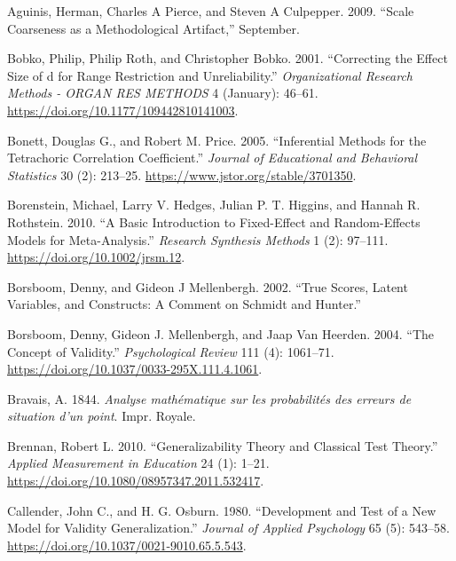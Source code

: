 \documentclass[
  letterpaper,
  DIV=11,
  numbers=noendperiod]{scrreprt}
\newlength{\cslhangindent}
\newlength{\cslentryspacingunit} %
\newenvironment{CSLReferences}[2] %
 {%
  \setlength{\parindent}{0pt}
  \ifodd #1
  \let\oldpar\par
  \def\par{\hangindent=\cslhangindent\oldpar}
  \fi
  \setlength{\parskip}{#2\cslentryspacingunit}
 }%
 {}
\begin{document}
\hypertarget{refs}{}
\begin{CSLReferences}{1}{0}
\leavevmode{}%
Aguinis, Herman, Charles A Pierce, and Steven A Culpepper. 2009.
{``Scale Coarseness as a Methodological Artifact,''} September.

\leavevmode{}%
Bobko, Philip, Philip Roth, and Christopher Bobko. 2001. {``Correcting
the Effect Size of d for Range Restriction and Unreliability.''}
\emph{Organizational Research Methods - ORGAN RES METHODS} 4 (January):
46--61. \url{https://doi.org/10.1177/109442810141003}.

\leavevmode{}%
Bonett, Douglas G., and Robert M. Price. 2005. {``Inferential Methods
for the Tetrachoric Correlation Coefficient.''} \emph{Journal of
Educational and Behavioral Statistics} 30 (2): 213--25.
\url{https://www.jstor.org/stable/3701350}.

\leavevmode{}%
Borenstein, Michael, Larry V. Hedges, Julian P. T. Higgins, and Hannah
R. Rothstein. 2010. {``A Basic Introduction to Fixed-Effect and
Random-Effects Models for Meta-Analysis.''} \emph{Research Synthesis
Methods} 1 (2): 97--111. \url{https://doi.org/10.1002/jrsm.12}.

\leavevmode{}%
Borsboom, Denny, and Gideon J Mellenbergh. 2002. {``True Scores, Latent
Variables, and Constructs: A Comment on Schmidt and Hunter.''}

\leavevmode{}%
Borsboom, Denny, Gideon J. Mellenbergh, and Jaap Van Heerden. 2004.
{``The Concept of Validity.''} \emph{Psychological Review} 111 (4):
1061--71. \url{https://doi.org/10.1037/0033-295X.111.4.1061}.

\leavevmode{}%
Bravais, A. 1844. \emph{Analyse mathématique sur les probabilités des
erreurs de situation d'un point}. Impr. Royale.

\leavevmode{}%
Brennan, Robert L. 2010. {``Generalizability Theory and Classical Test
Theory.''} \emph{Applied Measurement in Education} 24 (1): 1--21.
\url{https://doi.org/10.1080/08957347.2011.532417}.

\leavevmode{}%
Callender, John C., and H. G. Osburn. 1980. {``Development and Test of a
New Model for Validity Generalization.''} \emph{Journal of Applied
Psychology} 65 (5): 543--58.
\url{https://doi.org/10.1037/0021-9010.65.5.543}.


\end{CSLReferences}
\end{document}
